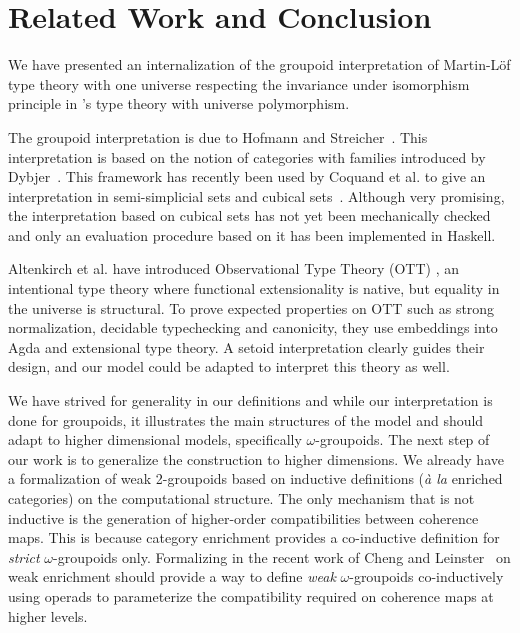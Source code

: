
\section{Related Work and Conclusion}
\label{sec:conclusion}

We have presented an internalization of the groupoid interpretation of
Martin-Löf type theory with one universe respecting the invariance under
isomorphism principle in \Coq's type theory with universe polymorphism.

The groupoid interpretation is due to Hofmann
and Streicher~\cite{groupoid-interp}. This interpretation is based on
the notion of categories with families introduced by
Dybjer~\cite{dybjer:internaltt}. 
%
This framework has recently been used by Coquand et al. to give an
interpretation in semi-simplicial sets and cubical
sets~\cite{barras:_gener_takeut_gandy_inter,coquand:cubical}.
%
Although very promising, the interpretation based on cubical sets has not
yet been mechanically checked and only an evaluation procedure based on
it has been implemented in Haskell.

Altenkirch et al. have introduced Observational Type Theory (OTT)
\cite{altenkirch-mcbride-wierstra:ott-now}, an intentional type theory where
functional extensionality is native, but equality in the universe is structural.
%
To prove expected properties on OTT such as strong normalization,
decidable typechecking and canonicity, they use embeddings into Agda and
extensional type theory. A setoid interpretation clearly guides their
design, and our model could be adapted to interpret this theory as well.

We have strived for generality in our definitions and while our
interpretation is done for groupoids, it illustrates the main structures of the
model and should adapt to higher dimensional models, specifically
$\omega$-groupoids.
%
The next step of our work is to generalize the construction to higher
dimensions. We already have a formalization of weak 2-groupoids based
on inductive definitions (\emph{à la} enriched categories) on the
computational structure.
%
The only mechanism that is not inductive is the generation of
higher-order compatibilities between coherence maps. 
%
This is because category enrichment provides a co-inductive definition
for \emph{strict} $\omega$-groupoids only. Formalizing in \Coq the recent work
of Cheng and Leinster~\cite{cheng2012weak} on weak enrichment should
provide a way to define \emph{weak} $\omega$-groupoids co-inductively using
operads to parameterize the compatibility required on coherence maps at
higher levels.
  

